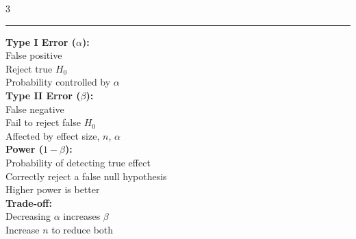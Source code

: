\documentclass[8pt, letterpaper]{article}
\newcommand{\sectionhead}[1]{%
    \vspace{1.2mm}{\large\bfseries#1}\vspace{0.2mm}\hrule\vspace{0.8mm}%
}
\begin{document}
\begin{multicols}{3}
\sectionhead{Type I \& II Errors}

\textbf{Type I Error ($\alpha$):} \\
False positive \\
Reject true $H_0$ \\
Probability controlled by $\alpha$ \\[1mm]
\textbf{Type II Error ($\beta$):} \\
False negative \\
Fail to reject false $H_0$ \\
Affected by effect size, $n$, $\alpha$ \\[1mm]
\textbf{Power ($1-\beta$):} \\
Probability of detecting true effect \\
Correctly reject a false null hypothesis \\
Higher power is better \\[1mm]
\textbf{Trade-off:} \\
Decreasing $\alpha$ increases $\beta$ \\
Increase $n$ to reduce both

\end{multicols}
\end{document}
